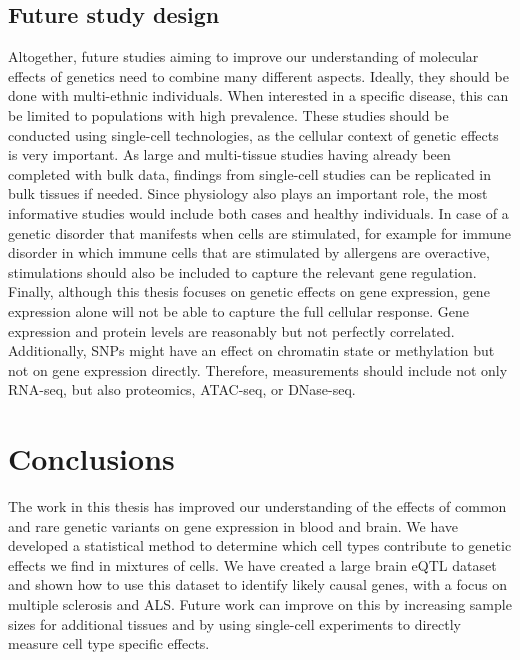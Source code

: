 \subsection{Future study design}
Altogether, future studies aiming to improve our understanding of molecular effects of genetics need to combine many different aspects. Ideally, they should be done with multi-ethnic individuals. When interested in a specific disease, this can be limited to populations with high prevalence. These studies should be conducted using single-cell technologies, as the cellular context of genetic effects is very important. As large\cite{vosaUnravelingPolygenicArchitecture2018} and multi-tissue\cite{thegtexconsortiumGTExConsortiumAtlas2020} studies having already been completed with bulk data, findings from single-cell studies can be replicated in bulk tissues if needed. Since physiology also plays an important role, the most informative studies would include both cases and healthy individuals. In case of a genetic disorder that manifests when cells are stimulated, for example for immune disorder in which immune cells that are stimulated by allergens are overactive, stimulations should also be included to capture the relevant gene regulation. Finally, although this thesis focuses on genetic effects on gene expression, gene expression alone will not be able to capture the full cellular response. Gene expression and protein levels are reasonably but not perfectly correlated\cite{buccitelliMRNAsProteinsEmerging2020}. Additionally, SNPs might have an effect on chromatin state or methylation but not on gene expression directly. Therefore, measurements should include not only RNA-seq, but also proteomics, ATAC-seq, or DNase-seq. 

\section{Conclusions}
The work in this thesis has improved our understanding of the effects of common and rare genetic variants on gene expression in blood and brain. We have developed a statistical method to determine which cell types contribute to genetic effects we find in mixtures of cells. We have created a large brain eQTL dataset and shown how to use this dataset to identify likely causal genes, with a focus on multiple sclerosis and ALS. Future work can improve on this by increasing sample sizes for additional tissues and by using single-cell experiments to directly measure cell type specific effects. 





\leftwatermark{}
\rightwatermark{}